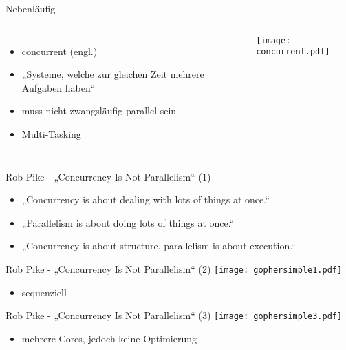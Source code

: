 \documentclass[compress]{beamer}
\begin{document}

  \begin{frame}{Nebenläufig}
    \begin{columns}[c]
      \begin{itemize}
        \item concurrent (engl.)
        \item „Systeme, welche zur gleichen Zeit mehrere \alert{Aufgaben} haben“
        \item muss nicht zwangsläufig parallel sein
        \item Multi-Tasking
      \end{itemize}
      \texttt{[image: concurrent.pdf]}
    \end{columns}
  \end{frame}

  \note[itemize]{}

  \begin{frame}{Rob Pike - „Concurrency Is Not Parallelism“ (1)}
    \begin{itemize}
      \item „Concurrency is about dealing with lots of things at once.“
      \item „Parallelism is about doing lots of things at once.“
      \item „Concurrency is about structure, parallelism is about execution.“
    \end{itemize}
  \end{frame}


  \begin{frame}{Rob Pike - „Concurrency Is Not Parallelism“ (2)}
    \texttt{[image: gophersimple1.pdf]}
    \begin{itemize}
      \item sequenziell
    \end{itemize}
  \end{frame}

  \begin{frame}{Rob Pike - „Concurrency Is Not Parallelism“ (3)}
    \texttt{[image: gophersimple3.pdf]}
    \begin{itemize}
      \item mehrere Cores, jedoch keine Optimierung
    \end{itemize}
  \end{frame}
\end{document}
